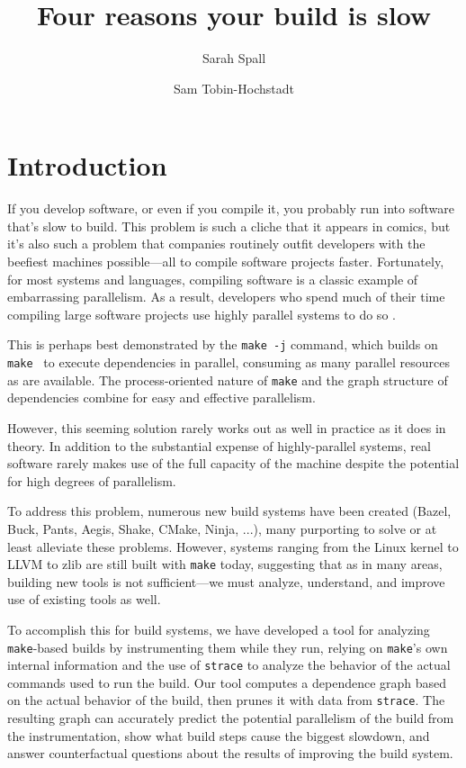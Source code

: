 \documentclass[sigconf,10pt,authorversion]{acmart}\settopmatter{printfolios=true,printccs=false,printacmref=false}
\title{Four reasons your build is slow}
\author{Sarah Spall}
\affiliation{Indiana University}
\author{Sam Tobin-Hochstadt}
\affiliation{Indiana University}
\begin{document}
\maketitle

\section{Introduction}

If you develop software, or even if you compile it, you probably run
into software that's slow to build. This problem is such a cliche that
it appears in comics, but it's also such a problem that companies
routinely outfit developers with the beefiest machines possible---all
to compile software projects faster. Fortunately, for most systems and
languages, compiling software is a classic example of embarrassing
parallelism. As a result, developers who spend much of their time
compiling large software projects use highly parallel systems to do so
\cite{regehr-tweet}.

This is perhaps best demonstrated by the  \verb|make -j|
command, which builds on \verb|make|~\cite{make} to execute
dependencies in parallel, consuming as many parallel resources as are
available. The process-oriented nature of \verb|make| and the graph
structure of dependencies combine for easy and effective parallelism.

However, this seeming solution rarely works out as well in practice as
it does in theory. In addition to the substantial expense of
highly-parallel systems, real software rarely makes use of the full
capacity of the machine despite the potential for high
degrees of parallelism.

To address this problem, numerous new build systems have been created
(Bazel, Buck, Pants, Aegis, Shake, CMake, Ninja, ...), many purporting
to solve or at least alleviate these problems. However, systems
 ranging from the Linux kernel to LLVM to zlib are still built
with \verb|make| today, suggesting that as in many areas, building new
tools is not sufficient---we must analyze, understand, and improve use
of existing tools as well.

To accomplish this for build systems, we have developed a tool for
analyzing \verb|make|-based builds by instrumenting them while they
run, relying on \verb|make|'s own internal information and the use of
\verb|strace| to analyze the behavior of the actual commands used to
run the build. Our tool computes a dependence graph based on the
actual behavior of the build, then prunes it with data from
\verb|strace|. The resulting graph can accurately predict the
potential parallelism of the build from the instrumentation, show what
build steps cause the biggest slowdown, and answer counterfactual
questions about the results of improving the build system.
\end{document}

